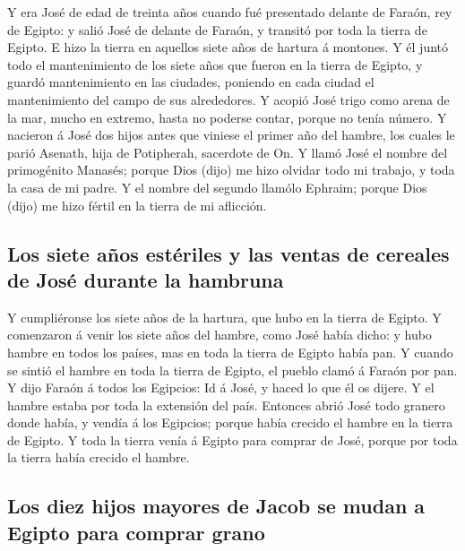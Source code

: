  Y era José de edad de treinta años cuando fué presentado
delante de Faraón, rey de Egipto: y salió José de delante de Faraón, y
transitó por toda la tierra de Egipto.  E hizo la tierra
en aquellos siete años de hartura á montones.  Y él juntó
todo el mantenimiento de los siete años que fueron en la tierra de
Egipto, y guardó mantenimiento en las ciudades, poniendo en cada ciudad
el mantenimiento del campo de sus alrededores.  Y acopió
José trigo como arena de la mar, mucho en extremo, hasta no poderse
contar, porque no tenía número.  Y nacieron á José dos
hijos antes que viniese el primer año del hambre, los cuales le parió
Asenath, hija de Potipherah, sacerdote de On.  Y llamó
José el nombre del primogénito Manasés; porque Dios (dijo) me hizo
olvidar todo mi trabajo, y toda la casa de mi padre.  Y
el nombre del segundo llamólo Ephraim; porque Dios (dijo) me hizo fértil
en la tierra de mi aflicción.

\hypertarget{los-siete-auxf1os-estuxe9riles-y-las-ventas-de-cereales-de-josuxe9-durante-la-hambruna}{%
\subsection{Los siete años estériles y las ventas de cereales de José
durante la
hambruna}\label{los-siete-auxf1os-estuxe9riles-y-las-ventas-de-cereales-de-josuxe9-durante-la-hambruna}}

 Y cumpliéronse los siete años de la hartura, que hubo en
la tierra de Egipto.  Y comenzaron á venir los siete años
del hambre, como José había dicho: y hubo hambre en todos los países,
mas en toda la tierra de Egipto había pan.  Y cuando se
sintió el hambre en toda la tierra de Egipto, el pueblo clamó á Faraón
por pan. Y dijo Faraón á todos los Egipcios: Id á José, y haced lo que
él os dijere.  Y el hambre estaba por toda la extensión
del país. Entonces abrió José todo granero donde había, y vendía á los
Egipcios; porque había crecido el hambre en la tierra de Egipto.
 Y toda la tierra venía á Egipto para comprar de José,
porque por toda la tierra había crecido el hambre.

\hypertarget{los-diez-hijos-mayores-de-jacob-se-mudan-a-egipto-para-comprar-grano}{%
\subsection{Los diez hijos mayores de Jacob se mudan a Egipto para
comprar
grano}\label{los-diez-hijos-mayores-de-jacob-se-mudan-a-egipto-para-comprar-grano}}

